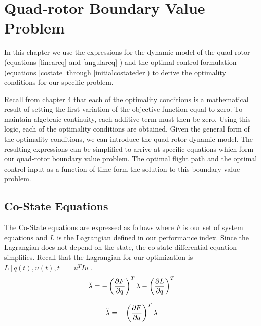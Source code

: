 
\chapter{Quad-rotor Boundary Value Problem} %

\label{Chapter5}


In this chapter we use the expressions for the dynamic model of the quad-rotor (equations \ref{lineareq} and \ref{angulareq} ) and the optimal control formulation (equations \ref{costate} through \ref{initialcostateder}) to derive the optimality conditions for our specific problem.

Recall from chapter 4 that each of the optimality conditions is a mathematical result of setting the first variation of the objective function equal to zero. To maintain algebraic continuity, each additive term must then be zero. Using this logic, each of the optimality conditions are obtained. Given the general form of the optimality conditions, we can introduce the quad-rotor dynamic model. The resulting expressions can be simplified to arrive at specific equations which form our quad-rotor boundary value problem. The optimal flight path and the optimal control input as a function of time form the solution to this boundary value problem.


\section{Co-State Equations}


The Co-State equations are expressed as follows where $F$ is our set of system equations and $L$ is the Lagrangian defined in our performance index. Since the Lagrangian does not depend on the state, the co-state differential equation simplifies. Recall that the Lagrangian for our optimization is $ L[q(t),u(t),t] = u^T I u $ .
\begin{equation}
    \ddot{\lambda} = -\left(\frac{\partial F}{\partial q}\right)^T \lambda - \left(\frac{\partial L}{\partial q}\right)^T
\end{equation}

\begin{equation}
    \ddot{\lambda} = -\left(\frac{\partial F}{\partial q}\right)^T \lambda
\end{equation}

